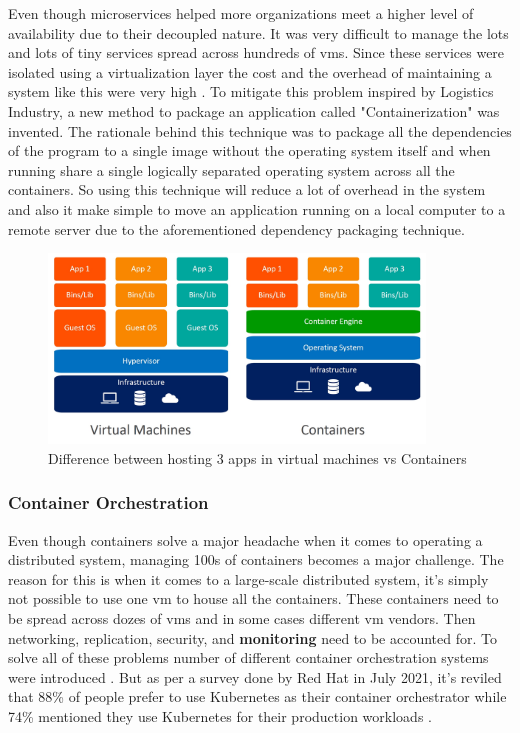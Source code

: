 Even though microservices helped more organizations meet a higher level of availability due to their decoupled nature. It was very difficult to manage the lots and lots of tiny services spread across hundreds of \acp{vm}. Since these services were isolated using a virtualization layer the cost and the overhead of maintaining a system like this were very high \citep{dua2014virtualization}. To mitigate this problem inspired by Logistics Industry, a new method to package an application called "Containerization" was invented. The rationale behind this technique was to package all the dependencies of the program to a single image without the operating system itself and when running share a single logically separated operating system across all the containers. So using this technique will reduce a lot of overhead in the system and also it make simple to move an application running on a local computer to a remote server due to the aforementioned dependency packaging technique.

\begin{figure}[H]
    \includegraphics[width=10cm]{assets/literature-review/containers-vs-virtual-machines.jpg}
    \caption{Difference between hosting 3 apps in virtual machines vs Containers \citep{Dockervs91:online}}
\end{figure}

\subsubsection{Container Orchestration}

Even though containers solve a major headache when it comes to operating a distributed system, managing 100s of containers becomes a major challenge. The reason for this is when it comes to a large-scale distributed system, it's simply not possible to use one \ac{vm} to house all the containers. These containers need to be spread across dozes of \acp{vm} and in some cases different \ac{vm} vendors. Then networking, replication, security, and \textbf{monitoring} need to be accounted for. To solve all of these problems number of different container orchestration systems were introduced \citep{ElasticityCloudComputing}. But as per a survey done by Red Hat in July 2021, it's reviled that 88\% of people prefer to use Kubernetes as their container orchestrator while 74\% mentioned they use Kubernetes for their production workloads \citep{Kubernet59:online}.

